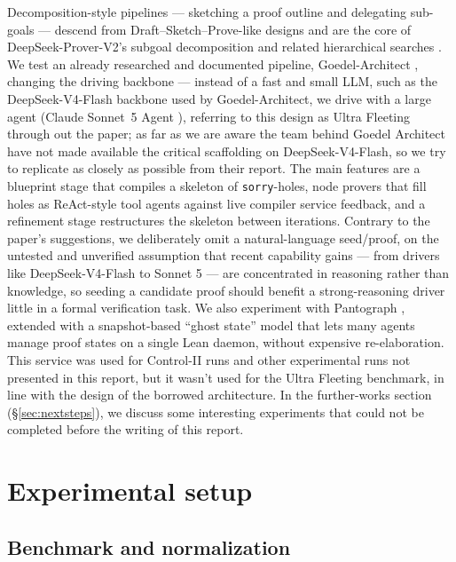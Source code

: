 \documentclass[12pt, a4paper]{article}
\begin{document}
Decomposition-style pipelines --- sketching a proof outline and delegating
sub-goals --- descend from Draft--Sketch--Prove-like designs and are the core of
DeepSeek-Prover-V2's subgoal decomposition \cite{deepseekproverv2} and related
hierarchical searches \cite{lample2022hypertree,decomposition_openreview}. We test an already
researched and documented pipeline, Goedel-Architect \cite{goedelarchitect}, changing the driving
backbone --- instead of a fast and small LLM, such as the DeepSeek-V4-Flash backbone used by
Goedel-Architect, we drive with a large agent (Claude Sonnet~5 Agent \cite{anthropic2026sonnet5}),
referring to this design as Ultra Fleeting through out the paper;
as far as we are aware the team behind Goedel Architect have not made available the critical
scaffolding on DeepSeek-V4-Flash, so we try to replicate as closely as possible from their report.
The main features are a blueprint stage that compiles a skeleton of \texttt{sorry}-holes, 
node provers that fill holes as ReAct-style tool agents \cite{yao2023react} against live compiler service feedback, 
and a refinement stage restructures the skeleton between iterations. Contrary to the paper's suggestions, we 
deliberately omit a natural-language seed/proof, on the untested and unverified assumption 
that recent capability gains — from drivers like DeepSeek-V4-Flash to Sonnet 5 — are concentrated in reasoning 
rather than knowledge, so seeding a candidate proof should benefit a strong-reasoning driver little in a formal verification task. 
We also experiment with Pantograph \cite{aniva2024pantograph,pypantograph}, extended with a
snapshot-based ``ghost state'' model \cite{shen2026snapshot,leakii2026upgrade}
that lets many agents manage proof states on a single Lean daemon, without expensive re-elaboration. 
This service was used for Control-II runs and other experimental runs not presented in this report, 
but it wasn't used for the Ultra Fleeting benchmark, in line with the design of
the borrowed architecture. In the further-works section (\S\ref{sec:nextsteps}), we discuss some
interesting experiments that could not be completed before the writing of this report.

\section{Experimental setup}

\subsection{Benchmark and normalization}
\label{sec:benchmark}
\end{document}
